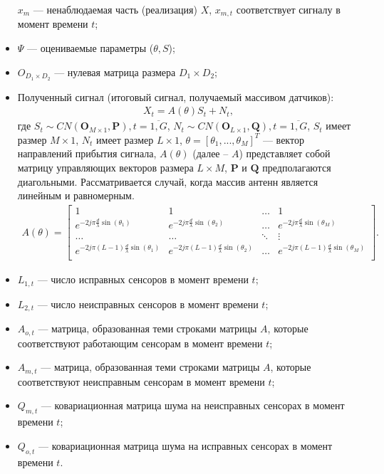 \documentclass[11pt]{article}
\begin{document}
\begin{itemize}
$x_m$ --- ненаблюдаемая часть (реализация) $X$, $x_{m,t}$ соответствует сигналу в момент времени $t$;
\item
$\Psi$ --- оцениваемые параметры ($\theta, S$);
\item
$O_{D_1 \times D_2}$ --- нулевая матрица размера $D_1 \times D_2$;
\item
Полученный сигнал (итоговый сигнал, получаемый массивом датчиков):
\begin{equation}
\begin{gathered}
X_t=A(\theta)S_t+N_t,
\end{gathered}
\end{equation}
где $S_t \sim CN(\mathbf{O}_{M \times 1},\mathbf{P}),t=\overline{1,G}$, $N_t \sim CN(\mathbf{O}_{L \times 1},\mathbf{Q}), t=\overline{1,G}$, $S_t$ имеет размер $M \times 1$,  $N_t$ имеет размер $L \times 1$, $\theta=[\theta_1,...,\theta_M]^T$ --- вектор направлений прибытия сигнала, $A(\theta)$ (далее -- $A$) представляет собой матрицу управляющих векторов размера $L \times M$, $\mathbf{P}$ и $\mathbf{Q}$ предполагаются диагольными. Рассматривается случай, когда массив антенн является линейным и равномерным.
\begin{gather}
A(\theta) = \begin{bmatrix}
1&1&\dots&1\\
e^{-2j\pi \frac{d}{\lambda}\sin(\theta_1)}& e^{-2j\pi \frac{d}{\lambda}\sin(\theta_2)}&\dots&e^{-2j\pi \frac{d}{\lambda}\sin(\theta_M)}\\
\dots&\dots&\ddots&\vdots\\
e^{-2j\pi (L-1) \frac{d}{\lambda}\sin(\theta_1)}& e^{-2j\pi (L-1) \frac{d}{\lambda}\sin(\theta_2)}&\dots&e^{-2j\pi (L-1) \frac{d}{\lambda}\sin(\theta_M)}\\
\end{bmatrix}.
\nonumber
\end{gather}
\end{itemize}
\begin{itemize}
\item
$L_{1,t}$ --- число исправных сенсоров в момент времени $t$;
\item
 $L_{2,t}$ --- число неисправных сенсоров в момент времени $t$;
\item 
$A_{o,t}$ --- матрица, образованная теми строками матрицы $A$, которые соответствуют работающим сенсорам в момент времени $t$; 
\item
$A_{m,t}$ --- матрица, образованная теми строками матрицы $A$, которые соответствуют неисправным сенсорам в момент времени $t$;
\item
$Q_{m,t}$ --- ковариационная матрица шума на неисправных сенсорах в момент времени $t$;
\item 
 $Q_{o,t}$ --- ковариационная матрица шума на исправных сенсорах в момент времени $t$.
\end{itemize}
\end{document}
